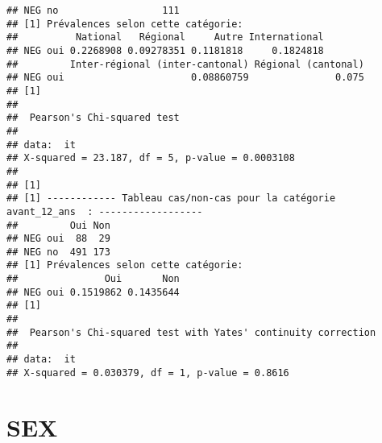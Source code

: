 \documentclass[
]{article}
\begin{document}
\begin{verbatim}
## NEG no                  111
## [1] Prévalences selon cette catégorie:
##          National   Régional     Autre International
## NEG oui 0.2268908 0.09278351 0.1181818     0.1824818
##         Inter-régional (inter-cantonal) Régional (cantonal)
## NEG oui                      0.08860759               0.075
## [1] 
## 
##  Pearson's Chi-squared test
## 
## data:  it
## X-squared = 23.187, df = 5, p-value = 0.0003108
## 
## [1] 
## [1] ------------ Tableau cas/non-cas pour la catégorie  avant_12_ans  : ------------------
##         Oui Non
## NEG oui  88  29
## NEG no  491 173
## [1] Prévalences selon cette catégorie:
##               Oui       Non
## NEG oui 0.1519862 0.1435644
## [1] 
## 
##  Pearson's Chi-squared test with Yates' continuity correction
## 
## data:  it
## X-squared = 0.030379, df = 1, p-value = 0.8616
\end{verbatim}

\hypertarget{sex}{%
\section{SEX}\label{sex}}
\end{document}
